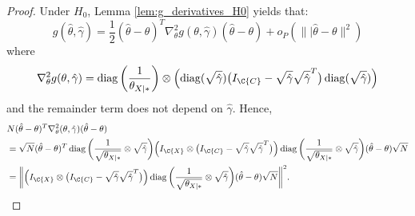 \begin{proof}
  Under $H_0$, Lemma \ref{lem:g_derivatives_H0} yields that:
  $$g(\hat\theta, \hat\gamma) = \frac{1}{2} (\hat\theta - \theta)^T \nabla_\theta^2 g(\theta,\hat\gamma) (\hat\theta - \theta) + o_P(\lVert|\hat\theta - \theta\rVert^2)$$
  where
  $$\nabla^2_{\theta} g(\theta,\hat\gamma) = \diag\bigg(\frac{1}{\theta_{X|\ast}}\bigg) \otimes \left(\diag(\sqrt{\hat\gamma}) \big(I_{\C{C}} - \sqrt{\hat\gamma} \sqrt{\hat\gamma}^T\big)\diag(\sqrt{\hat\gamma})\right)$$
  and the remainder term does not depend on $\hat\gamma$.
  Hence,
  \begin{equation*}\begin{split}
    & N (\hat\theta - \theta)^T \nabla_\theta^2(\theta,\hat\gamma) (\hat\theta - \theta) \\
    & = \sqrt{N} (\hat\theta - \theta)^T \diag\bigg(\frac{1}{\sqrt{\theta_{X|\ast}}} \otimes \sqrt{\hat\gamma}\bigg) \Big(I_{\C{X}} \otimes \big(I_{\C{C}} - \sqrt{\hat\gamma} \sqrt{\hat\gamma}^T\big)\Big) \diag\bigg(\frac{1}{\sqrt{\theta_{X|\ast}}} \otimes \sqrt{\hat\gamma}\bigg) (\hat\theta - \theta) \sqrt{N} \\
    & = \bigg\lVert \Big(I_{\C{X}} \otimes \big(I_{\C{C}} - \sqrt{\hat\gamma} \sqrt{\hat\gamma}^T\big)\Big) \diag\bigg(\frac{1}{\sqrt{\theta_{X|\ast}}} \otimes \sqrt{\hat\gamma}\bigg) (\hat\theta - \theta) \sqrt{N} \bigg\rVert^2.
  \end{split}\end{equation*}


\end{proof}
